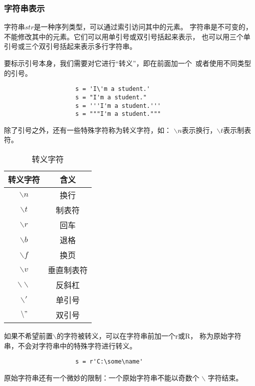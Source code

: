 \documentclass[a4paper, 12pt]{article}
\begin{document}
        \subsubsection{字符串表示}
            字符串\(str\)是一种序列类型，可以通过索引访问其中的元素。
            字符串是不可变的，不能修改其中的元素。它们可以用单引号或双引号括起来表示，
            也可以用三个单引号或三个双引号括起来表示多行字符串。\par
            要标示引号本身，我们需要对它进行“转义”，即在前面加一个 \,或者使用不同类型的引号。\par
            \begin{listing}[h!]
                \begin{verbatim}
                    s = 'I\'m a student.'
                    s = "I'm a student."
                    s = '''I'm a student.'''
                    s = """I'm a student."""
                \end{verbatim}
            \end{listing}
            除了引号之外，还有一些特殊字符称为转义字符，如：
            \(\backslash n\)表示换行，\(\backslash t\)表示制表符。\par
            \begin{table}[h!]
                \centering
                \caption{转义字符}
                \begin{tabular}{|c|c|}
                    \hline
                    转义字符 & 含义\\
                    \hline
                    \(\backslash n\) & 换行\\
                    \(\backslash t\) & 制表符\\
                    \(\backslash r\) & 回车\\
                    \(\backslash b\) & 退格\\
                    \(\backslash f\) & 换页\\
                    \(\backslash v\) & 垂直制表符\\
                    \(\backslash \backslash\) & 反斜杠\\
                    \(\backslash '\) & 单引号\\
                    \(\backslash "\) & 双引号\\
                    \hline
                \end{tabular}
            \end{table}
            如果不希望前置$\backslash$的字符被转义，可以在字符串前加一个r或R，
            称为原始字符串，不会对字符串中的特殊字符进行转义。\par
            \begin{listing}[h!]
                \begin{verbatim}
                    s = r'C:\some\name'
                \end{verbatim}
            \end{listing}
            原始字符串还有一个微妙的限制：一个原始字符串不能以奇数个 $\backslash$ 字符结束。
\end{document}
